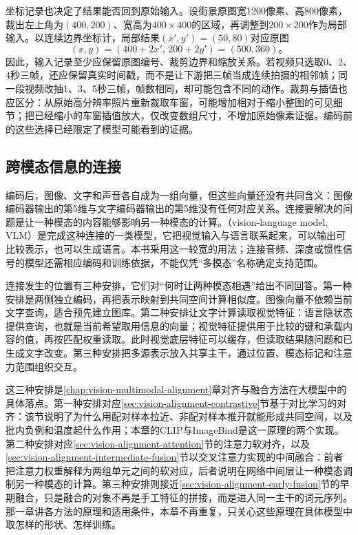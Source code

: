 坐标记录也决定了结果能否回到原始输入。设街景原图宽1200像素、高800像素，裁出左上角为$(400,200)$、宽高为$400\times400$的区域，再调整到$200\times200$作为局部输入。以连续边界坐标计，局部结果$(x',y')=(50,80)$对应原图
\[
  (x,y)=(400+2x',\,200+2y')=(500,360)\text{。}
\]
因此，输入记录至少应保留原图编号、裁剪边界和缩放关系。若视频只选取0、2、4秒三帧，还应保留真实时间戳，而不是让下游把三帧当成连续拍摄的相邻帧；同一段视频改抽1、3、5秒三帧，帧数相同，却可能包含不同的动作。裁剪与插值也应区分：从原始高分辨率照片重新裁取车窗，可能增加相对于缩小整图的可见细节；把已经缩小的车窗插值放大，仅改变数组尺寸，不增加原始像素证据。编码前的这些选择已经限定了模型可能看到的证据。

\subsection{跨模态信息的连接}
\label{sec:vision-models-connection}

编码后，图像、文字和声音各自成为一组向量，但这些向量还没有共同含义：图像编码器输出的第5维与文字编码器输出的第5维没有任何对应关系。连接要解决的问题是让一种模态的内容能够影响另一种模态的计算。（vision-language model, VLM）是完成这种连接的一类模型，它把视觉输入与语言联系起来，可以输出可比较表示，也可以生成语言。本书采用这一较宽的用法；连接音频、深度或惯性信号的模型还需相应编码和训练依据，不能仅凭“多模态”名称确定支持范围。

连接发生的位置有三种安排，它们对“何时让两种模态相遇”给出不同回答。第一种安排是两侧独立编码，再把表示映射到共同空间计算相似度。图像向量不依赖当前文字查询，适合预先建立图库。第二种安排让文字计算读取视觉特征：语言隐状态提供查询，也就是当前希望取用信息的向量；视觉特征提供用于比较的键和承载内容的值，再按匹配权重读取。此时视觉底层特征可以缓存，但读取结果随问题和已生成文字改变。第三种安排把多源表示放入共享主干，通过位置、模态标记和注意力范围组织交互。

这三种安排是\ref{chap:vision-multimodal-alignment}章对齐与融合方法在大模型中的具体落点。第一种安排对应\ref{sec:vision-alignment-contrastive}节基于对比学习的对齐：该节说明了为什么用配对样本拉近、非配对样本推开就能形成共同空间，以及批内负例和温度起什么作用；本章的CLIP与ImageBind是这一原理的两个实现。第二种安排对应\ref{sec:vision-alignment-attention}节的注意力软对齐，以及\ref{sec:vision-alignment-intermediate-fusion}节以交叉注意力实现的中间融合：前者把注意力权重解释为两组单元之间的软对应，后者说明在网络中间层让一种模态调制另一种模态的计算。第三种安排则接近\ref{sec:vision-alignment-early-fusion}节的早期融合，只是融合的对象不再是手工特征的拼接，而是进入同一主干的词元序列。那一章讲各方法的原理和适用条件，本章不再重复，只关心这些原理在具体模型中取怎样的形状、怎样训练。

